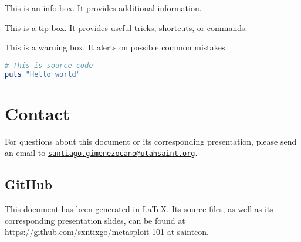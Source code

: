\begin{infobox}
    This is an info box. It provides additional information.
\end{infobox}

\begin{tipbox}
    This is a tip box. It provides useful tricks, shortcuts, or commands.
\end{tipbox}

\begin{warnbox}
    This is a warning box. It alerts on possible common mistakes.
\end{warnbox}

\begin{listingbox}
\begin{lstlisting}[language=ruby]
# This is source code
puts "Hello world"
\end{lstlisting}    
\end{listingbox}

\section*{Contact}

For questions about this document or its corresponding presentation, please send an email to \href{mailto:santiago.gimenezocano@utahsaint.org}{\texttt{santiago.gimenezocano@utahsaint.org}}.

\subsection*{GitHub}

This document has been generated in \LaTeX. Its source files, as well as its corresponding presentation slides, can be found at \url{https://github.com/sxntixgo/metasploit-101-at-saintcon}.